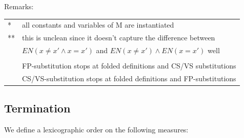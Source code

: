 \documentclass[a4paper]{article}
\begin{document}
Remarks:\\
\begin{tabular}{ll}
  * & all constants and variables of M are instantiated \\
  ** & this is unclean since it doesn't capture the difference between \\
     &  $EN (x\neq x' \land x=x')$ and $EN (x\neq x') \land EN (x=x')$ well\\
  \\
  & FP-substitution stops at folded definitions and CS/VS substitutions\\
  & CS/VS-substitution stops at folded definitions and FP-substitutions\\
\end{tabular}


\subsection{Termination}
\label{sec:termination}

We define a lexicographic order on the following measures:
\end{document}
